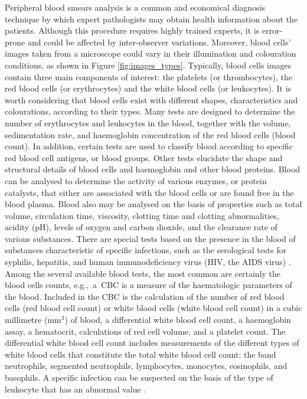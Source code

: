 \documentclass[final,a4paper,12pt,english]{UnicaPhdThesis3}
\begin{document}
	Peripheral blood smears analysis is a common and economical diagnosis technique by which expert pathologists may obtain health information about the patients. Although this procedure requires highly trained experts, it is error-prone and could be affected by inter-observer variations. Moreover, blood cells' images taken from a microscope could vary in their illumination and colouration conditions, as shown in Figure \ref{fig:images_types}. Typically, blood cells images contain three main components of interest: the platelets (or thrombocytes), the red blood cells (or erythrocytes) and the white blood cells (or leukocytes). It is worth considering that blood cells exist with different shapes, characteristics and colourations, according to their types.
	Many tests are designed to determine the number of erythrocytes and leukocytes in the blood, together with the volume, sedimentation rate, and haemoglobin concentration of the red blood cells (blood count). In addition, certain tests are used to classify blood according to specific red blood cell antigens, or blood groups. Other tests elucidate the shape and structural details of blood cells and haemoglobin and other blood proteins. Blood can be analysed to determine the activity of various enzymes, or protein catalysts, that either are associated with the blood cells or are found free in the blood plasma.
	Blood also may be analysed on the basis of properties such as total volume, circulation time, viscosity, clotting time and clotting abnormalities, acidity (pH), levels of oxygen and carbon dioxide, and the clearance rate of various substances. There are special tests based on the presence in the blood of substances characteristic of specific infections, such as the serological tests for syphilis, hepatitis, and human immunodeficiency virus (HIV, the AIDS virus) \cite{Brit}.
	Among the several available blood tests, the most common are certainly the blood cells counts, \mbox{e.g., a CBC} is a measure of the haematologic parameters of the blood. Included in the CBC is the calculation of the number of red blood cells (red blood cell count) or white blood cells (white blood cell count) in a cubic millimetre (mm$^{3}$) of blood, a differential white blood cell count, a haemoglobin assay, a hematocrit, calculations of red cell volume, and a platelet count. The differential white blood cell count includes measurements of the different types of white blood cells that constitute the total white blood cell count: the band neutrophils, segmented neutrophils, lymphocytes, monocytes, eosinophils, and basophils. A specific infection can be suspected on the basis of the type of leukocyte that has an abnormal value \cite{DiRuberto2016}.
	
\end{document}
